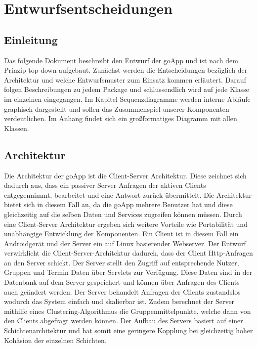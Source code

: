 

\section{Entwurfsentscheidungen}
	\subsection{Einleitung}
	Das folgende Dokument beschreibt den Entwurf der goApp und ist nach dem Prinzip top-down aufgebaut.
	Zunächst werden die Entscheidungen bezüglich der Architektur und welche Entwurfsmuster zum Einsatz kommen erläutert.
	Darauf folgen Beschreibungen zu jedem Package und schlussendlich wird auf jede Klasse im einzelnen eingegangen.
	Im Kapitel Sequenzdiagramme werden interne Abläufe graphisch dargestellt und sollen das Zusammenspiel unserer Komponenten verdeutlichen. 
	Im Anhang findet sich ein großformatiges Diagramm mit allen Klassen.
	
\subsection{Architektur}
	Die Architektur der goApp ist die Client-Server Architektur. Diese zeichnet sich dadurch aus, dass ein passiver Server Anfragen der aktiven Clients entgegennimmt, bearbeitet und eine Antwort zurück übermittelt. Die Architektur bietet sich in diesem Fall an, da die goApp mehrere Benutzer hat und diese gleichzeitig auf die selben Daten und Services zugreifen können müssen. Durch eine Client-Server Architektur ergeben sich weitere Vorteile wie Portabilität und unabhängige Entwicklung der Komponenten.
Ein Client ist in diesem Fall ein Androidgerät und der Server ein auf Linux basierender Webserver.
Der Entwurf verwirklicht die Client-Server-Architektur dadurch, dass der Client Http-Anfragen an den Server schickt. Der Server stellt den Zugriff auf entsprechende Nutzer, Gruppen und Termin Daten über Servlets zur Verfügung. Diese Daten sind in der Datenbank auf dem Server gespeichert und können über Anfragen des Clients auch geändert werden.
Der Server behandelt Anfragen der Clients zustandslos wodurch das System einfach und skalierbar ist.
Zudem berechnet der Server mithilfe eines Clustering-Algorithmus die Gruppenmittelpunkte, welche dann von den Clients abgefragt werden können. \newline
Der Aufbau des Servers basiert auf einer Schichtenarchitektur und hat somit eine geringere Kopplung bei gleichzeitig hoher Kohäsion der einzelnen Schichten.
	
